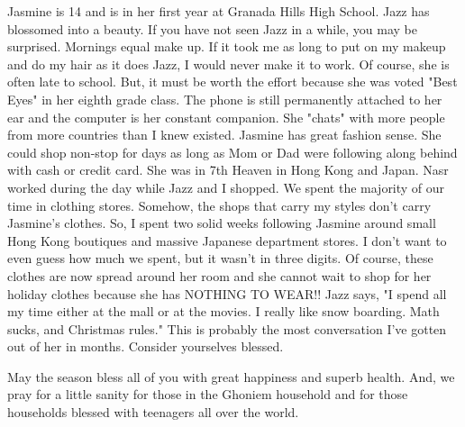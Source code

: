 Jasmine is 14 and is in her first year at Granada Hills High School. Jazz has blossomed into a beauty.  If you have not seen Jazz in a while,
you may be surprised. Mornings equal make up.  If it took me as long to put on my makeup and do my hair as it does Jazz, I would never make it
to work.  Of course, she is often late to school. But, it must be worth the effort because she was voted "Best Eyes" in her eighth grade class.
The phone is still permanently attached to her ear and the computer is her constant companion.  She "chats" with more people from more countries
than I knew existed.  Jasmine has great fashion sense. She could shop non-stop for days as long as Mom or Dad were following along behind with
cash or credit card.  She was in 7th Heaven in Hong Kong and Japan.  Nasr worked during the day while Jazz and I shopped.  We spent the majority
of our time in clothing stores. Somehow, the shops that carry my styles don't carry Jasmine's clothes.  So, I spent two solid weeks following
Jasmine around small Hong Kong boutiques and massive Japanese department stores.  I don't want to even guess how much we spent, but it wasn't in
three digits.  Of course, these clothes are now spread around her room and she cannot wait to shop for her holiday clothes because she has
NOTHING TO WEAR!!   Jazz  says, "I spend all my time either at the mall or at the movies.  I really like snow boarding.  Math sucks, and
Christmas rules."  This is probably the most conversation I've gotten out of her in months.  Consider yourselves blessed.

May the season bless all of you with great happiness and superb health.    And, we pray for a little sanity for those in the Ghoniem household
and for those households blessed with teenagers all over the world.



%
